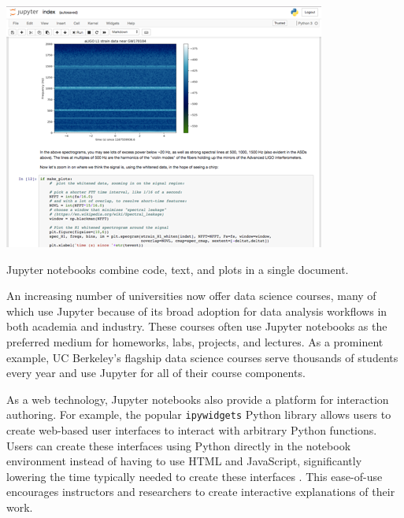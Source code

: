 \documentclass[nobib]{tufte-handout}
\newcommand{\code}[1]{\texttt{#1}}
\begin{document}
\begin{marginfigure}%
  \includegraphics[width=\linewidth]{graphics/jupyter.png}
  \caption{Jupyter notebooks combine code, text, and plots in a single
  document.}
  \label{fig:jupyter}
\end{marginfigure}

An increasing number of universities now offer data science courses, many of
which use Jupyter because of its broad adoption for data analysis workflows in
both academia and industry. These courses often use Jupyter notebooks as the
preferred medium for homeworks, labs, projects, and lectures. As a prominent
example, UC Berkeley's flagship data science courses serve thousands of
students every year and use Jupyter for all of their course components.

As a web technology, Jupyter notebooks also provide a platform for interaction
authoring. For example, the popular \code{ipywidgets} Python library allows
users to create web-based user interfaces to interact with arbitrary Python
functions. Users can create these interfaces using Python directly in the
notebook environment instead of having to use HTML and JavaScript,
significantly lowering the time typically needed to create these interfaces
\cite{_jupyter-widgets/ipywidgets_}. This ease-of-use encourages instructors
and researchers to create interactive explanations of their work.
\end{document}
